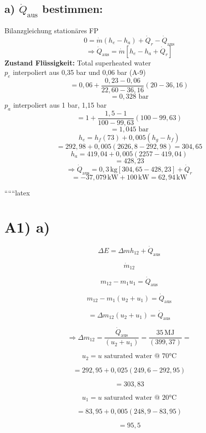 \subsection*{a) $\dot{Q}_{\text{aus}}$ bestimmen:}
Bilanzgleichung stationäres FP
\[
0 = \dot{m} (h_e - h_a) + \dot{Q}_r - \dot{Q}_{\text{aus}}
\]
\[
\Rightarrow \dot{Q}_{\text{aus}} = \dot{m} [h_e - h_a + \dot{Q}_r]
\]
\textbf{Zustand Flüssigkeit:} Total superheated water \\
$p_e$ interpoliert aus 0,35 bar und 0,06 bar (A-9)
\[
= 0,06 + \frac{0,23 - 0,06}{22,60 - 36,16} (20 - 36,16)
\]
\[
= 0,328 \text{ bar}
\]
$p_a$ interpoliert aus 1 bar, 1,15 bar
\[
= 1 + \frac{1,5 - 1}{100 - 99,63} (100 - 99,63)
\]
\[
= 1,045 \text{ bar}
\]
\[
h_e = h_f (73) + 0,005 (h_{g} - h_{f})
\]
\[
= 292,98 + 0,005 (2626,8 - 292,98) = 304,65
\]
\[
h_a = 419,04 + 0,005 (2257 - 419,04)
\]
\[
= 428,23
\]
\[
\Rightarrow \dot{Q}_{\text{aus}} = 0,3 \, \text{kg} \left[ 304,65 - 428,23 \right] + \dot{Q}_r
\]
\[
= -37,079 \, \text{kW} + 100 \, \text{kW} = 62,94 \, \text{kW}
\]

``````latex

\section*{A1) a)}

\[
\Delta E = \Delta m h_{12} + \dot{Q}_{\text{aus}}
\]

\[
\dot{m}_{12}
\]

\[
m_{12} - m_{1} u_{1} = \dot{Q}_{\text{aus}}
\]

\[
m_{12} - m_{1} (u_{2} + u_{1}) = \dot{Q}_{\text{aus}}
\]

\[
= \Delta m_{12} (u_{2} + u_{1}) = \dot{Q}_{\text{aus}}
\]

\[
\Rightarrow \Delta m_{12} = \frac{\dot{Q}_{\text{aus}}}{(u_{2} + u_{1})} = \frac{35 \, \text{MJ}}{(399,37)} =
\]

\[
u_{2} = u \text{ saturated water @ 70°C}
\]

\[
= 292,95 + 0,025 (249,6 - 292,95)
\]

\[
= 303,83
\]

\[
u_{1} = u \text{ saturated water @ 20°C}
\]

\[
= 83,95 + 0,005 (248,9 - 83,95)
\]

\[
= 95,5
\]